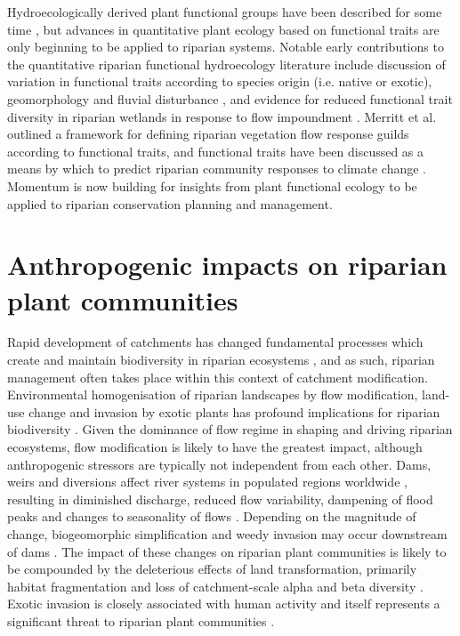 \documentclass[openright,12pt,a4paper]{memoir}
\begin{document}
Hydroecologically derived plant functional groups have been described for some time \cite{Stromberg2010, Casanova2011}, but advances in quantitative plant ecology based on functional traits are only beginning to be applied to riparian systems. Notable early contributions to the quantitative riparian functional hydroecology literature include discussion of variation in functional traits according to species origin (i.e. native or exotic), geomorphology and fluvial disturbance \cite{Kyle2009, Kyle2009a}, and evidence for reduced functional trait diversity in riparian wetlands in response to flow impoundment \cite{Catford2011}. Merritt et al. \cite{Merrit2010} outlined a framework for defining riparian vegetation flow response guilds according to functional traits, and functional traits have been discussed as a means by which to predict riparian community responses to climate change \cite{Catford2012a, Kominoski2013}. Momentum is now building for insights from plant functional ecology to be applied to riparian conservation planning and management.

\section{Anthropogenic impacts on riparian plant communities}
Rapid development of catchments has changed fundamental processes which create and maintain biodiversity in riparian ecosystems \cite{Nilsson2002}, and as such, riparian management often takes place within this context of catchment modification. Environmental homogenisation of riparian landscapes by flow modification, land-use change and invasion by exotic plants has profound implications for riparian biodiversity \cite{Brierley1999, Richardson2007, Poff2010}. Given the dominance of flow regime in shaping and driving riparian ecosystems, flow modification is likely to have the greatest impact, although anthropogenic stressors are typically not independent from each other. Dams, weirs and diversions affect river systems in populated regions worldwide \cite{Nilsson2002}, resulting in diminished discharge, reduced flow variability, dampening of flood peaks and changes to seasonality of flows \cite{Graf2006, Singer2007}. Depending on the magnitude of change, biogeomorphic simplification and weedy invasion may occur downstream of dams \cite{Graf2006, Naiman2008, Catford2011}. The impact of these changes on riparian plant communities is likely to be compounded by the deleterious effects of land transformation, primarily habitat fragmentation and loss of catchment-scale alpha and beta diversity \cite{Vitousek1997, Gerstner2014}. Exotic invasion is closely associated with human activity \cite{Vitousek1996} and itself represents a significant threat to riparian plant communities \cite{Richardson2007}.
\end{document}
